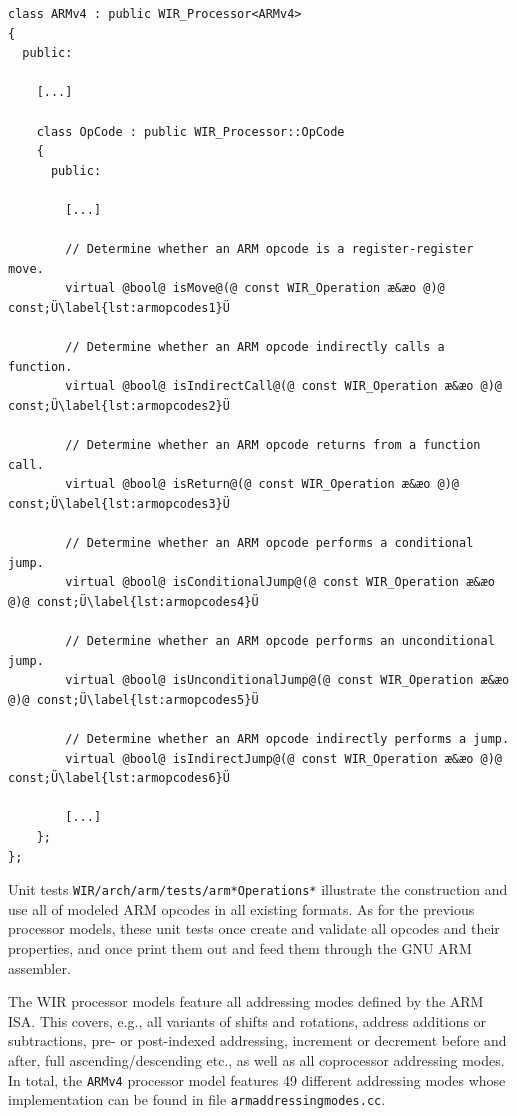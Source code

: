 \begin{lstlisting}[style=code,float=!t,caption={Specific Opcode Handling of Class \texttt{ARMv4}},label=lst:armopcodes]
class ARMv4 : public WIR_Processor<ARMv4>
{
  public:

    [...]

    class OpCode : public WIR_Processor::OpCode
    {
      public:

        [...]

        // Determine whether an ARM opcode is a register-register move.
        virtual @bool@ isMove@(@ const WIR_Operation æ&æo @)@ const;Ü\label{lst:armopcodes1}Ü

        // Determine whether an ARM opcode indirectly calls a function.
        virtual @bool@ isIndirectCall@(@ const WIR_Operation æ&æo @)@ const;Ü\label{lst:armopcodes2}Ü

        // Determine whether an ARM opcode returns from a function call.
        virtual @bool@ isReturn@(@ const WIR_Operation æ&æo @)@ const;Ü\label{lst:armopcodes3}Ü

        // Determine whether an ARM opcode performs a conditional jump.
        virtual @bool@ isConditionalJump@(@ const WIR_Operation æ&æo @)@ const;Ü\label{lst:armopcodes4}Ü

        // Determine whether an ARM opcode performs an unconditional jump.
        virtual @bool@ isUnconditionalJump@(@ const WIR_Operation æ&æo @)@ const;Ü\label{lst:armopcodes5}Ü

        // Determine whether an ARM opcode indirectly performs a jump.
        virtual @bool@ isIndirectJump@(@ const WIR_Operation æ&æo @)@ const;Ü\label{lst:armopcodes6}Ü

        [...]
    };
};
\end{lstlisting}

Unit tests \texttt{WIR/arch/arm/tests/arm*Operations*} illustrate the construction and use all of modeled ARM opcodes in all existing formats.
As for the previous processor models, these unit tests once create and validate all opcodes and their properties, and once print them out and feed them through the GNU ARM assembler.

The \gls{WIR} processor models feature all addressing modes defined by the ARM \gls{ISA}.
This covers, e.g., all variants of shifts and rotations, address additions or subtractions, pre- or post-indexed addressing, increment or decrement before and after, full ascending/descending etc., as well as all coprocessor addressing modes.
In total, the \texttt{ARMv4} processor model features 49 different addressing modes whose implementation can be found in file \texttt{armaddressingmodes.cc}.

